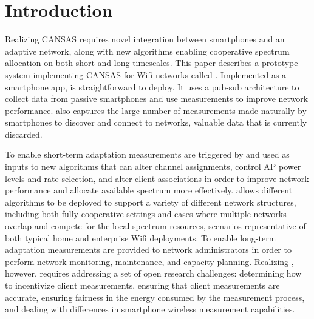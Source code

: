 \section{Introduction}

\newpage
Realizing CANSAS requires novel integration between smartphones and an
adaptive network, along with new algorithms enabling cooperative spectrum
allocation on both short and long timescales. This paper describes a
prototype system implementing CANSAS for Wifi networks called \PS{}.
Implemented as a smartphone app, \PS{} is straightforward to deploy. It uses
a pub-sub architecture to collect data from passive smartphones and use
measurements to improve network performance. \PS{} also captures the large
number of measurements made naturally by smartphones to discover and connect
to networks, valuable data that is currently discarded.

To enable short-term adaptation measurements are triggered by and used as
inputs to new algorithms that can alter channel assignments, control AP power
levels and rate selection, and alter client associations in order to improve
network performance and allocate available spectrum more effectively. \PS{}
allows different algorithms to be deployed to support a variety of different
network structures, including both fully-cooperative settings and cases where
multiple networks overlap and compete for the local spectrum resources,
scenarios representative of both typical home and enterprise Wifi
deployments. To enable long-term adaptation measurements are provided to
network administrators in order to perform network monitoring, maintenance,
and capacity planning. Realizing \PS{}, however, requires addressing a set of
open research challenges: determining how to incentivize client measurements,
ensuring that client measurements are accurate, ensuring fairness in the
energy consumed by the measurement process, and dealing with differences in
smartphone wireless measurement capabilities.

